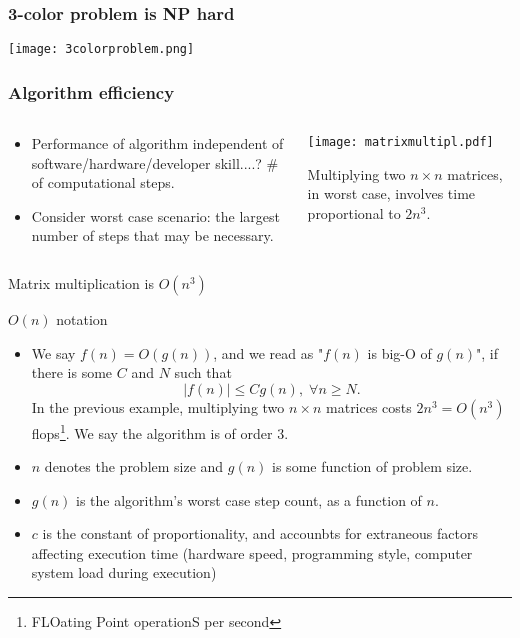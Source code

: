\documentclass[c]{beamer}
\begin{document}
\begin{frame}
  \frametitle{3-color problem is NP hard}
  \texttt{[image: 3colorproblem.png]}
\end{frame}

\begin{frame}
  \frametitle{Algorithm efficiency}
  \begin{columns}
    \begin{column}{0.4\textwidth}
      \begin{itemize}
        \item Performance of algorithm independent of software/hardware/developer skill....? \# of computational steps.
        \item Consider worst case scenario: the largest number of steps that may be necessary.
      \end{itemize}
    \end{column}
    \begin{column}{0.6\textwidth}
      \begin{center}
        \texttt{[image: matrixmultipl.pdf]}
      \end{center}
      \footnotesize
      Multiplying two $n\times n$ matrices, in worst case, involves time proportional to $2n^3$.
      \normalsize
    \end{column}
  \end{columns}
\end{frame}



\begin{frame}{Matrix multiplication is $O(n^3)$}
  \begin{footnotesize}
  
\end{footnotesize}
\end{frame}

\begin{frame}{$O(n)$ notation}
  \begin{itemize}
    \item We say $f(n)=O(g(n))$, and we read as "$f(n)$ is big-O of $g(n)$", if there is some $C$ and $N$ such that
    \[
      |f(n)| \leq C g(n), \; \forall n\geq N.
    \]
    In the previous example, multiplying two $n \times n$ matrices costs $2n^3=O(n^3)$ flops\footnote{FLOating Point operationS per second}. We say the algorithm is of order 3.
    \item $n$ denotes the problem size and $g(n)$ is some function of problem size.
    \item $g(n)$ is the algorithm's worst case step count, as a function of $n$.
    \item $c$ is the constant of proportionality, and accounbts for extraneous factors affecting execution time (hardware speed, programming style, computer system load during execution)
  \end{itemize}
\end{frame}
\end{document}
